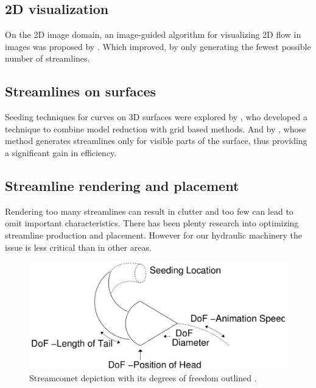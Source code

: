 \subsection{2D visualization}

On the 2D image domain, an image-guided algorithm for visualizing 2D flow in images was proposed by \cite{Turk1996}.
Which \cite{Li2008} improved, by only generating the fewest possible number of streamlines. 

\subsection{Streamlines on surfaces}

Seeding techniques for curves on 3D surfaces were explored by  \cite{Wicke2009}, who developed a technique to combine model reduction with grid based methods.
And by \cite{Spencer2009}, whose method generates streamlines only for visible parts of the surface, thus providing a significant gain in efficiency.

\subsection{Streamline rendering and placement}

Rendering too many streamlines can result in clutter and too few can lead to omit important characteristics.
There has been plenty research into optimizing streamline production and placement.
However for our hydraulic machinery the issue is less critical than in other areas.

\begin{figure}[!htbp]
	\centering
	\includegraphics[scale=.2]{images/streamComet}
	\caption{Streamcomet depiction with its degrees of freedom outlined \cite{Laramee2005}.}
	\label{fig:streamComent}
\end{figure}

